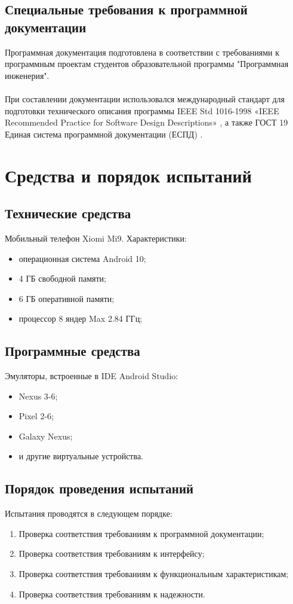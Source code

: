 \documentclass[draft]{article}
\begin{document}
\subsection{Специальные требования к программной документации}
Программная документация подготовлена в соответствии с требованиями к программным проектам студентов образовательной программы "{}Программная инженерия"{}.\\
~\\
При составлении документации использовался международный стандарт для подготовки технического описания программы IEEE Std 1016-1998 «IEEE Recommended Practice for Software Design Descriptions» \cite{litlink12}, а также ГОСТ 19 Единая система программной документации (ЕСПД) \cite{litlink13}.
\newpage
\section {Средства и порядок испытаний}
\subsection {Технические средства}
Мобильный телефон Xiomi Mi9. Характеристики:
\begin{itemize}
\item операционная система Android 10;
\item 4 ГБ свободной памяти;
\item 6 ГБ оперативной памяти;
\item процессор 8 яндер Max 2.84 ГГц;
\end{itemize}
\subsection {Программные средства}
Эмуляторы, встроенные в IDE Android Studio:
\begin{itemize}
\item Nexus 3-6;
\item Pixel 2-6;
\item Galaxy Nexus;
\item и другие виртуальные устройства.
\end{itemize}
\subsection {Порядок проведения испытаний}
Испытания проводятся в следующем порядке:
\begin{enumerate}
\item  Проверка соответствия требованиям к программной документации;
\item  Проверка соответствия требованиям к интерфейсу;
\item Проверка соответствия требованиям к функциональным характеристикам;
\item Проверка соответствия требованиям к надежности.
\end{enumerate}
\newpage
\end{document}
